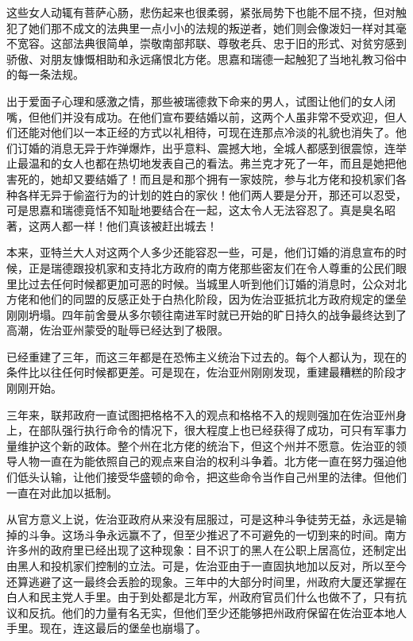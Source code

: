 \par 这些女人动辄有菩萨心肠，悲伤起来也很柔弱，紧张局势下也能不屈不挠，但对触犯了她们那不成文的法典里一点小小的法规的叛逆者，她们则会像泼妇一样对其毫不宽容。这部法典很简单，崇敬南部邦联、尊敬老兵、忠于旧的形式、对贫穷感到骄傲、对朋友慷慨相助和永远痛恨北方佬。思嘉和瑞德一起触犯了当地礼教习俗中的每一条法规。
\par 出于爱面子心理和感激之情，那些被瑞德救下命来的男人，试图让他们的女人闭嘴，但他们并没有成功。在他们宣布要结婚以前，这两个人虽非常不受欢迎，但人们还能对他们以一本正经的方式以礼相待，可现在连那点冷淡的礼貌也消失了。他们订婚的消息无异于炸弹爆炸，出乎意料、震撼大地，全城人都感到很震惊，连举止最温和的女人也都在热切地发表自己的看法。弗兰克才死了一年，而且是她把他害死的，她却又要结婚了！而且是和那个拥有一家妓院，参与北方佬和投机家们各种各样无异于偷盗行为的计划的姓白的家伙！他们两人要是分开，那还可以忍受，可是思嘉和瑞德竟恬不知耻地要结合在一起，这太令人无法容忍了。真是臭名昭著，这两人都一样！他们真该被赶出城去！
\par 本来，亚特兰大人对这两个人多少还能容忍一些，可是，他们订婚的消息宣布的时候，正是瑞德跟投机家和支持北方政府的南方佬那些密友们在令人尊重的公民们眼里比过去任何时候都更加可恶的时候。当城里人听到他们订婚的消息时，公众对北方佬和他们的同盟的反感正处于白热化阶段，因为佐治亚抵抗北方政府规定的堡垒刚刚坍塌。四年前舍曼从多尔顿往南进军时就已开始的旷日持久的战争最终达到了高潮，佐治亚州蒙受的耻辱已经达到了极限。
\par 已经重建了三年，而这三年都是在恐怖主义统治下过去的。每个人都认为，现在的条件比以往任何时候都更差。可是现在，佐治亚州刚刚发现，重建最糟糕的阶段才刚刚开始。
\par 三年来，联邦政府一直试图把格格不入的观点和格格不入的规则强加在佐治亚州身上，在部队强行执行命令的情况下，很大程度上也已经获得了成功，可只有军事力量维护这个新的政体。整个州在北方佬的统治下，但这个州并不愿意。佐治亚的领导人物一直在为能依照自己的观点来自治的权利斗争着。北方佬一直在努力强迫他们低头认输，让他们接受华盛顿的命令，把这些命令当作自己州里的法律。但他们一直在对此加以抵制。
\par 从官方意义上说，佐治亚政府从来没有屈服过，可是这种斗争徒劳无益，永远是输掉的斗争。这场斗争永远赢不了，但至少推迟了不可避免的一切到来的时间。南方许多州的政府里已经出现了这种现象：目不识丁的黑人在公职上居高位，还制定出由黑人和投机家们控制的立法。可是，佐治亚由于一直固执地加以反对，所以至今还算逃避了这一最终会丢脸的现象。三年中的大部分时间里，州政府大厦还掌握在白人和民主党人手里。由于到处都是北方军，州政府官员们什么也做不了，只有抗议和反抗。他们的力量有名无实，但他们至少还能够把州政府保留在佐治亚本地人手里。现在，连这最后的堡垒也崩塌了。
